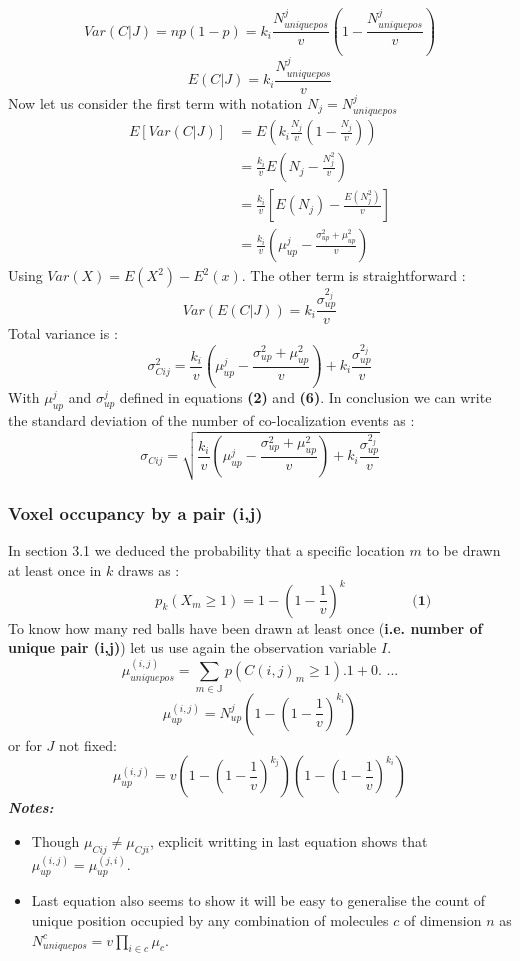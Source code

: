 \documentclass{article}
\begin{document}
\[
    Var(C|J) = np(1-p) = k_i \frac{N^j_{uniquepos}}{v}(1-\frac{N^j_{uniquepos}}{v})
\]
\[
    E(C|J) = k_i \frac{N^j_{uniquepos}}{v}
\]
Now let us consider the first term with notation $N_j = N^j_{uniquepos}$
\[
    \begin{split}
    E[Var(C|J)] &= E(k_i \frac{N_j}{v}(1-\frac{N_j}{v})) \\
    &= \frac{k_i}{v}E(N_j - \frac{N^2_j}{v}) \\
    &= \frac{k_i}{v}[E(N_j) - \frac{E(N^2_j)}{v}] \\
    &= \frac{k_i}{v}(\mu^j_{up} - \frac{\sigma^2_{up} + \mu^2_{up}}{v})
\end{split}
\]
Using $Var(X) = E(X^2) - E^2(x)$.\newline
The other term is straightforward : 
\[
Var(E(C|J)) = k_i\frac{\sigma^{2_j}_{up}}{v}
\]
Total variance is :
\[
    \sigma^2_{Cij} = \frac{k_i}{v}(\mu^j_{up} - \frac{\sigma^2_{up} + \mu^2_{up}}{v}) + k_i\frac{\sigma^{2_j}_{up}}{v}
\]
With $\mu^j_{up}$ and $\sigma^j_{up}$ defined in equations \textbf{(2)} and \textbf{(6)}.\newline
In conclusion we can write the standard deviation of the number of co-localization events as :
\begin{equation}
    \sigma_{Cij} = \sqrt{\frac{k_i}{v}(\mu^j_{up} - \frac{\sigma^2_{up} + \mu^2_{up}}{v}) + k_i\frac{\sigma^{2_j}_{up}}{v}}
\end{equation}




\subsubsection{Voxel occupancy by a pair (i,j)}
In section 3.1 we deduced the probability that a specific location $m$ to be drawn at least once  in $k$ draws as :
\[
    \hspace{2cm} p_k(X_m \geq 1) = 1-(1 - \frac{1}{v})^k \hspace{2cm} \textbf{(1)}
\]
To know how many red balls have been drawn at least once (\textbf{i.e. number of unique pair (i,j)}) let us use again the observation
variable $I$.
\[
\mu^{(i,j)}_{uniquepos} = \sum_{m \in \mathbb{J}}p(C(i,j)_m \geq 1).1 + 0. \textbf{ ...}
\]
\begin{equation}
\mu^{(i,j)}_{up} = N^j_{up}(1-(1-\frac{1}{v})^{k_i})
\end{equation}
or for $J$ not fixed:
\[
\mu^{(i,j)}_{up} = v(1-(1-\frac{1}{v})^{k_j})(1-(1-\frac{1}{v})^{k_i})
\]
\textit{\textbf{Notes:}}
\begin{itemize}
    \item Though $\mu_{Cij} \neq \mu_{Cji}$, explicit writting in last equation shows that \newline 
    $\mu^{(i,j)}_{up} = \mu^{(j,i)}_{up}$.
    \item Last equation also seems to show it will be easy to generalise the count of unique position occupied by any combination of molecules $c$ of dimension $n$
    as $N^c_{uniquepos} = v\prod_{i \in c}\mu_c$.
\end{itemize}
\end{document}
